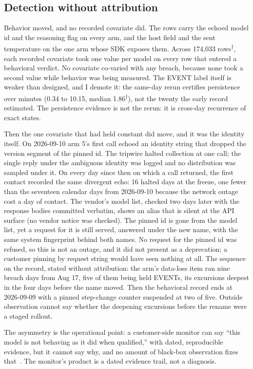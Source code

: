 \documentclass[conference]{IEEEtran}
\newcommand{\rows}{\textsuperscript{$\dagger$}}
\begin{document}
\subsection{Detection without attribution}
\label{sec:attr}

Behavior moved, and no recorded covariate did. The rows carry the
echoed model id and the reasoning flag on every arm, and the host
field and the sent temperature on the one arm whose SDK exposes them.
Across 174,033 rows\rows, each recorded covariate took one value per
model on every row that entered a behavioral verdict. No covariate
co-varied with any breach, because none took a second value while
behavior was being measured. The EVENT label itself is weaker than
designed, and I demote it: the same-day rerun certifies persistence
over minutes (0.34 to 10.15, median 1.86\rows), not the twenty the
early record estimated. The persistence evidence is not the rerun: it
is cross-day recurrence of exact states.

Then the one covariate that had held constant did move, and it was the
identity itself. On 2026-09-10 arm 5's first call echoed an identity
string that dropped the version segment of the pinned id. The tripwire
halted collection at one call; the single reply under the ambiguous
identity was logged and no distribution was sampled under it. On every
day since then on which a call returned, the first contact recorded
the same divergent echo: 16 halted days at the freeze, one fewer than
the seventeen calendar days from 2026-09-10 because the network outage
cost a day of contact. The vendor's model list, checked two days later
with the response bodies committed verbatim, shows an alias that is
silent at the API surface (no vendor notice was checked). The pinned
id is gone from the model list, yet a request for it is still served,
answered under the new name, with the same system fingerprint behind
both names. No request for the pinned id was refused, so this is not
an outage, and it did not present as a deprecation; a customer pinning
by request string would have seen nothing at all. The sequence on the
record, stated without attribution: the arm's data-loss item ran nine
breach days from Aug 17, five of them being held EVENTs, its
excursions deepest in the four days before the name moved. Then the
behavioral record ends at 2026-09-09 with a pinned step-change counter
suspended at two of five. Outside observation cannot say whether the
deepening excursions before the rename were a staged rollout.

The asymmetry is the operational point: a customer-side monitor can
say ``this model is not behaving as it did when qualified,'' with
dated, reproducible evidence, but it cannot say why, and no amount of
black-box observation fixes that~\cite{casper,cai}. The monitor's
product is a dated evidence trail, not a diagnosis.
\end{document}

